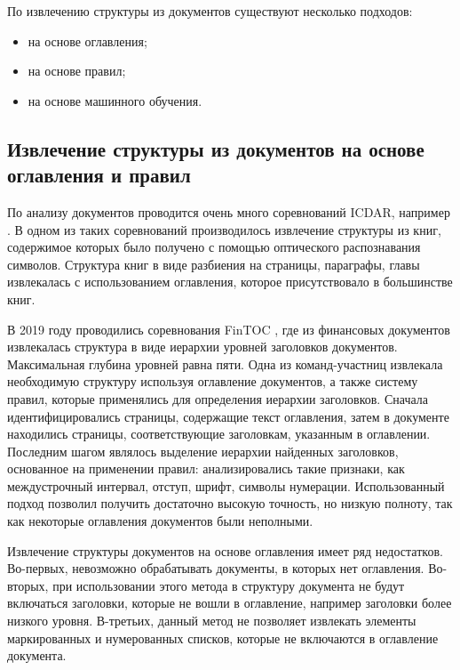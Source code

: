 \documentclass{ProcISPRAS}
\begin{document}
По извлечению структуры из документов существуют несколько подходов:
\begin{itemize}
\item на основе оглавления;
\item на основе правил;
\item на основе машинного обучения.
\end{itemize}

\subsection{Извлечение структуры из документов на основе оглавления и правил}

По анализу документов проводится очень много соревнований ICDAR, например \cite{icdar13, icdar17comp, icdar17}. В одном из таких соревнований \cite{icdar13} производилось извлечение структуры из книг, содержимое которых было получено с помощью оптического распознавания символов. Структура книг в виде разбиения на страницы, параграфы, главы извлекалась с использованием оглавления, которое присутствовало в большинстве книг. 

В 2019 году проводились соревнования FinTOC \cite{fintoc19comp}, где из финансовых документов извлекалась структура в виде иерархии уровней заголовков документов. Максимальная глубина уровней равна пяти. Одна из команд-участниц \cite{fintoc19daniel} извлекала необходимую структуру используя оглавление документов, а также систему правил, которые применялись для определения иерархии заголовков.
Сначала идентифицировались страницы, содержащие текст оглавления, затем в документе находились страницы, соответствующие заголовкам, указанным в оглавлении. 
Последним шагом являлось выделение иерархии найденных заголовков, основанное на применении правил: анализировались такие признаки, как междустрочный интервал, отступ, шрифт, символы нумерации.
Использованный подход позволил получить достаточно высокую точность, но низкую полноту, так как некоторые оглавления документов были неполными.

Извлечение структуры документов на основе оглавления имеет ряд недостатков. Во-первых, невозможно обрабатывать документы, в которых нет оглавления. Во-вторых, при использовании этого метода в структуру документа не будут включаться заголовки, которые не вошли в оглавление, например заголовки более низкого уровня. В-третьих, данный метод не позволяет извлекать элементы маркированных и нумерованных списков, которые не включаются в оглавление документа.
\end{document}
